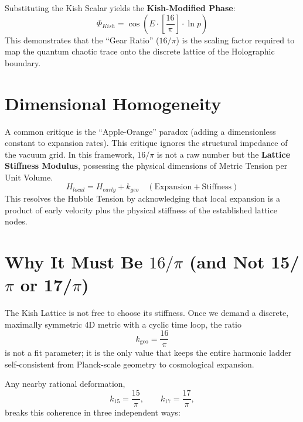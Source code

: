 \documentclass[11pt, letterpaper, openany]{book}
\begin{document}
Substituting the Kish Scalar yields the \textbf{Kish-Modified Phase}:
\begin{equation}
    \Phi_{Kish} = \cos\left( E \cdot \left[\frac{16}{\pi}\right] \cdot \ln p \right)
\end{equation}
This demonstrates that the ``Gear Ratio'' ($16/\pi$) is the scaling factor required to map the quantum chaotic trace onto the discrete lattice of the Holographic boundary.

\section{Dimensional Homogeneity}
A common critique is the ``Apple-Orange'' paradox (adding a dimensionless constant to expansion rates). This critique ignores the structural impedance of the vacuum grid.
In this framework, $16/\pi$ is not a raw number but the \textbf{Lattice Stiffness Modulus}, possessing the physical dimensions of Metric Tension per Unit Volume.
\begin{equation}
    H_{local} = H_{early} + k_{geo} \quad (\text{Expansion} + \text{Stiffness})
\end{equation}
This resolves the Hubble Tension by acknowledging that local expansion is a product of early velocity plus the physical stiffness of the established lattice nodes.

\section{Why It Must Be \texorpdfstring{$16/\pi$}{16/pi} (and Not 15/\texorpdfstring{$\pi$}{pi} or 17/\texorpdfstring{$\pi$}{pi})}
\label{sec:why_16_over_pi}

The Kish Lattice is not free to choose its stiffness. Once we demand a discrete, maximally
symmetric 4D metric with a cyclic time loop, the ratio
\begin{equation}
    k_{\text{geo}} = \frac{16}{\pi}
\end{equation}
is not a fit parameter; it is the only value that keeps the entire harmonic ladder self-consistent
from Planck-scale geometry to cosmological expansion.

Any nearby rational deformation,
\begin{equation}
    k_{15} = \frac{15}{\pi}, \qquad
    k_{17} = \frac{17}{\pi},
\end{equation}
breaks this coherence in three independent ways:
\end{document}
